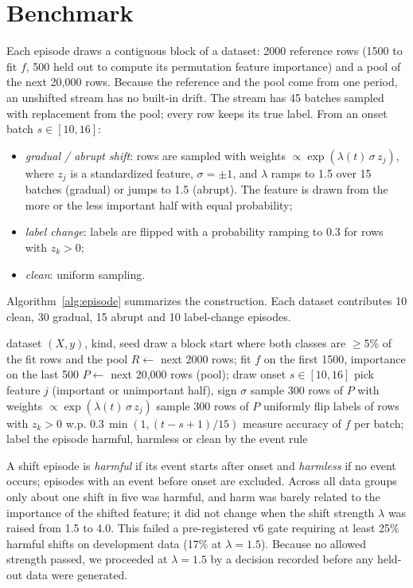 \documentclass[conference]{IEEEtran}
\begin{document}
\section{Benchmark}
Each episode draws a contiguous block of a dataset: 2000 reference rows (1500 to fit $f$, 500 held out to compute its permutation feature importance) and a pool of the next 20,000 rows. Because the reference and the pool come from one period, an unshifted stream has no built-in drift. The stream has 45 batches sampled with replacement from the pool; every row keeps its true label. From an onset batch $s \in [10, 16]$:
\begin{itemize}
\item \emph{gradual / abrupt shift}: rows are sampled with weights $\propto \exp(\lambda(t)\, \sigma\, z_j)$, where $z_j$ is a standardized feature, $\sigma=\pm1$, and $\lambda$ ramps to 1.5 over 15 batches (gradual) or jumps to 1.5 (abrupt). The feature is drawn from the more or the less important half with equal probability;
\item \emph{label change}: labels are flipped with a probability ramping to 0.3 for rows with $z_k>0$;
\item \emph{clean}: uniform sampling.
\end{itemize}
Algorithm~\ref{alg:episode} summarizes the construction. Each dataset contributes 10 clean, 30 gradual, 15 abrupt and 10 label-change episodes.

\begin{algorithm}[t]
\caption{Building one benchmark episode}
\label{alg:episode}
\footnotesize
\begin{algorithmic}[1]
\Require dataset $(X, y)$, kind, seed
\State draw a block start where both classes are $\geq$5\% of the fit rows and the pool
\State $R \gets$ next 2000 rows; fit $f$ on the first 1500, importance on the last 500
\State $P \gets$ next 20{,}000 rows (pool); draw onset $s \in [10,16]$
 \State pick feature $j$ (important or unimportant half), sign $\sigma$ \EndIf
{}
    \State sample 300 rows of $P$ with weights $\propto \exp(\lambda(t)\,\sigma\, z_j)$
  \Else
    \State sample 300 rows of $P$ uniformly
  \EndIf
   \State flip labels of rows with $z_k > 0$ w.p. $0.3\,\min(1, (t-s+1)/15)$ \EndIf
\EndFor
\State measure accuracy of $f$ per batch; label the episode harmful, harmless or clean by the event rule
\end{algorithmic}
\end{algorithm} A shift episode is \emph{harmful} if its event starts after onset and \emph{harmless} if no event occurs; episodes with an event before onset are excluded. Across all data groups only about one shift in five was harmful, and harm was barely related to the importance of the shifted feature; it did not change when the shift strength $\lambda$ was raised from 1.5 to 4.0. This failed a pre-registered v6 gate requiring at least 25\% harmful shifts on development data (17\% at $\lambda=1.5$). Because no allowed strength passed, we proceeded at $\lambda=1.5$ by a decision recorded before any held-out data were generated.
\end{document}
